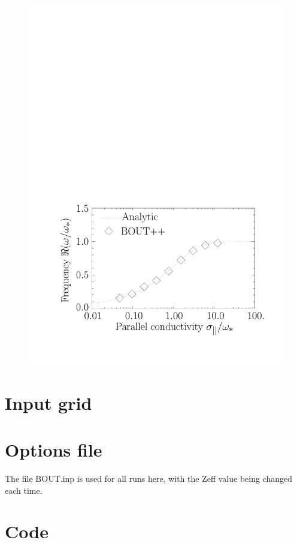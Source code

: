 \documentclass[12pt]{article}
\begin{document}
\begin{figure}[htbp!]
{  \includegraphics[scale=0.35]{drift_freq.pdf}
}
\end{figure}

\section{Input grid}



\section{Options file}

The file BOUT.inp is used for all runs here, with the 
Zeff value being changed each time.

\section{Code}





\end{document}

